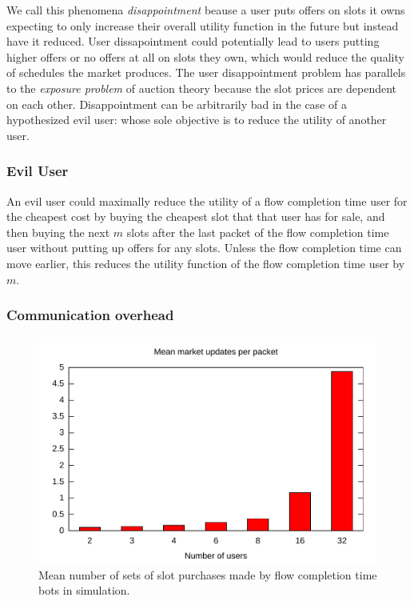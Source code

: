 We call this phenomena \emph{disappointment} beause a user puts offers on slots it owns expecting to only increase their overall utility function in the future but instead have it reduced. User dissapointment could potentially lead to users putting higher offers or no offers at all on slots they own, which would reduce the quality of schedules the market produces.
The user disappointment problem has parallels to the \emph{exposure problem} of auction theory \cite{milgrom00, englmaier06} because the slot prices are dependent on each other.
Disappointment can be arbitrarily bad in the case of a hypothesized evil user: whose sole objective is to reduce the utility of another user.
\subsubsection{Evil User}
An evil user could maximally reduce the utility of a flow completion time user for the cheapest cost by buying the cheapest slot that that user has for sale, and then buying the next $m$ slots after the last packet of the flow completion time user without putting up offers for any slots. Unless the flow completion time can move earlier, this reduces the utility function of the flow completion time user by $m$.%
\subsubsection{Communication overhead}

\begin{figure}
\includegraphics[width=\columnwidth]{plots/num_market_updates.pdf}
\caption{Mean number of sets of slot purchases made by flow completion time bots in simulation.}
\label{f:num_market_updates}
\end{figure}

